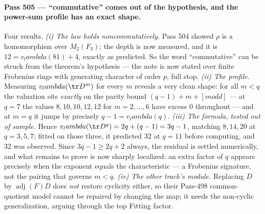 \documentclass[12pt,a4paper]{article}
\def\mathbb#1{#1}%
\def\textbf#1{#1}%
\def\text#1{#1}%
\def\lambda{lambda}%
\theoremstyle{definition}
\newcommand{\FF}{\mathbb{F}}
\begin{document}
\paragraph{Pass 505 --- ``commutative'' comes out of the hypothesis, and the
power-sum profile has an exact shape.}
Four results.  \emph{(i) The law holds noncommutatively.}  Pass 504 showed
$\rho$ is a homomorphism over $M_2(\FF_3)$; the depth is now measured, and it
is $12=v_\lambda(81)+4$, exactly as predicted.  \textbf{So the word
``commutative'' can be struck from the theorem's hypothesis} --- the note is
now stated over finite Frobenius rings with generating character of order $p$,
full stop.  \emph{(ii) The profile.}  Measuring $v_\lambda(\tr D^m)$ for every
$m$ reveals a very clean shape: for all $m<q$ the valuation sits
\emph{exactly} on the parity bound $(q-1)+m+[m\text{ odd}]$ --- at $q=7$ the
values $8,10,10,12,12$ for $m=2,\dots,6$ have excess $0$ throughout --- and at
$m=q$ it jumps by precisely $q-1=v_\lambda(q)$.  \emph{(iii) The formula, tested
out of sample.}  Hence $v_\lambda(\tr D^q)=2q+(q-1)=3q-1$, matching $8,14,20$
at $q=3,5,7$; fitted on those three, it \textbf{predicted $32$ at $q=11$ before
computing, and $32$ was observed}.  Since $3q-1\ge2q+2$ always, the residual is
settled numerically, and what remains to prove is now sharply localized: an
extra factor of $q$ appears precisely when the exponent equals the
characteristic --- a Frobenius signature, not the pairing that governs $m<q$.
\emph{(iv) The other track's module.}  Replacing $D$ by $\operatorname{adj}(F)D$
does \emph{not} restore cyclicity either, so their Pass-498 common-quotient
model cannot be repaired by changing the map; it needs the non-cyclic
generalization, arguing through the top Fitting factor.
\end{document}
